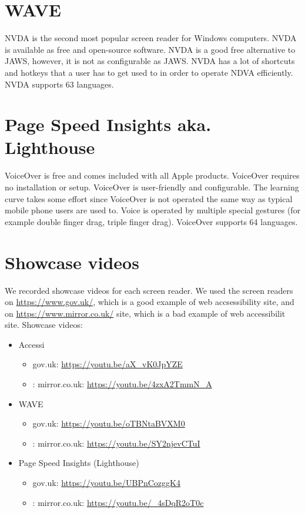 \section{WAVE}

NVDA is the second most popular screen reader for Windows computers. NVDA is available as free and open-source software. NVDA is a good free alternative to JAWS, however, it is not as configurable as JAWS. NVDA has a lot of shortcuts and hotkeys that a user has to get used to in order to operate NDVA efficiently. NVDA supports 63 languages.

\section{Page Speed Insights aka. Lighthouse}

VoiceOver is free and comes included with all Apple products. VoiceOver requires no installation or setup. VoiceOver is user-friendly and configurable. The learning curve takes some effort since VoiceOver is not operated the same way as typical mobile phone users are used to. Voice is operated by multiple special gestures (for example double finger drag, triple finger drag). VoiceOver supports 64 languages.

\section{Showcase videos}
We recorded showcase videos for each screen reader. We used the screen readers on \url{https://www.gov.uk/}, which is a good example of web accsessibility site, and on \url{https://www.mirror.co.uk/} site, which is a bad example of web accessibilit site.
Showcase videos:
\begin{itemize}
	\item Accessi
	\begin{itemize}
		\item gov.uk: \url{https://youtu.be/aX_vK0JpYZE}
		\item: mirror.co.uk: \url{https://youtu.be/4zxA2TmmN_A}
	\end{itemize}
	\item WAVE
	\begin{itemize}
		\item gov.uk: \url{https://youtu.be/oTBNtaBVXM0}
		\item: mirror.co.uk: \url{https://youtu.be/SY2njevCTuI}
	\end{itemize}
	\item Page Speed Insights (Lighthouse)
	\begin{itemize}
		\item gov.uk: \url{https://youtu.be/UBPnCozggK4}
		\item: mirror.co.uk: \url{https://youtu.be/_4sDqR2oT0c}
	\end{itemize}
\end{itemize}

